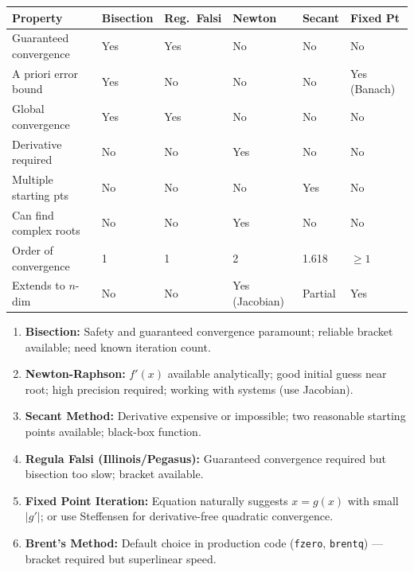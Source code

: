 \documentclass[12pt]{article}
\newcommand{\hcell}[1]{\textbf{\color{white}#1}}
\begin{document}
\begin{center}{\footnotesize\setlength{\tabcolsep}{4pt}
\begin{tabular}{p{3.8cm} C{1.8cm} C{1.8cm} C{1.8cm} C{1.8cm} C{1.8cm}}
\toprule
{}
\hcell{Property} & \hcell{Bisection} & \hcell{Reg.\ Falsi} & \hcell{Newton} & \hcell{Secant} & \hcell{Fixed Pt} \\
\midrule
{}
Guaranteed convergence & Yes & Yes & No & No & No \\
A priori error bound & Yes & No & No & No & Yes (Banach) \\
Global convergence & Yes & Yes & No & No & No \\
Derivative required & No & No & Yes & No & No \\
Multiple starting pts & No & No & No & Yes & No \\
Can find complex roots & No & No & Yes & No & No \\
Order of convergence & 1 & 1 & 2 & 1.618 & $\geq 1$ \\
Extends to $n$-dim & No & No & Yes (Jacobian) & Partial & Yes \\
\bottomrule
\end{tabular}
}\end{center}

\bigskip

\begin{tcolorbox}[
  enhanced, arc=4pt, boxrule=1.5pt,
  colback=lightbg, colframe=primary,
  left=12pt, right=12pt, top=10pt, bottom=10pt,
  title={\small\bfseries\color{white} Practical Guidelines for Method Selection},
  colbacktitle=primary,
]
\begin{enumerate}[noitemsep]
  \item \textbf{Bisection:} Safety and guaranteed convergence paramount; reliable bracket available; need known iteration count.
  \item \textbf{Newton-Raphson:} $f'(x)$ available analytically; good initial guess near root; high precision required; working with systems (use Jacobian).
  \item \textbf{Secant Method:} Derivative expensive or impossible; two reasonable starting points available; black-box function.
  \item \textbf{Regula Falsi (Illinois/Pegasus):} Guaranteed convergence required but bisection too slow; bracket available.
  \item \textbf{Fixed Point Iteration:} Equation naturally suggests $x=g(x)$ with small $|g'|$; or use Steffensen for derivative-free quadratic convergence.
  \item \textbf{Brent's Method:} Default choice in production code (\texttt{fzero}, \texttt{brentq}) — bracket required but superlinear speed.
\end{enumerate}
\end{tcolorbox}
\end{document}
